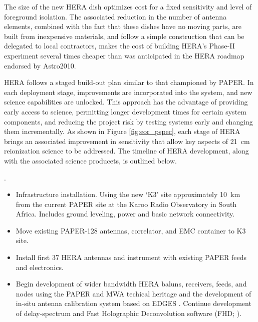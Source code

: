 \documentclass[preprint]{aastex}
\begin{document}
The size of the new HERA dish optimizes cost for a fixed sensitivity and level
of foreground isolation.  The associated reduction in the number of antenna
elements, combined with the fact that these dishes have no moving parts, are
built from inexpensive materials, and follow a simple construction that can be
delegated to local contractors, makes the cost of building HERA's Phase-II
experiment several times cheaper than was anticipated in the HERA roadmap
endorsed by Astro2010.  

HERA follows a staged build-out plan similar to that championed by PAPER.  In
each deployment stage, improvements are incorporated into the system, and new
science capabilities are unlocked.  This approach has the advantage of
providing early access to science, permitting longer development times for
certain system components, and reducing the project risk by testing systems
early and changing them incrementally.  As shown in Figure \ref{fig:eor_pspec}, each
stage of HERA brings an associated improvement in sensitivity that allow key
aspects of 21~cm reionization science to be addressed.  The timeline of HERA
development, along with the associated science producets, is outlined below. 


.  
\begin{itemize}\setlength{\parskip}{0pt}
\vspace{-7pt}
  \item Infrastructure installation. Using the new `K3' site approximately 10~km from the current PAPER site at the Karoo Radio Observatory in South Africa. Includes ground leveling, power and basic network connectivity.
  \item Move existing PAPER-128 antennas, correlator, and EMC container to K3 site.
  \item Install first 37 HERA antennas and instrument with existing PAPER feeds and electronics. 
  \item Begin development of wider bandwidth HERA baluns, receivers, feeds, and nodes using the PAPER and MWA techical heritage \citep{} and the development of in-situ antenna calibration system based on EDGES \citep{}. Continue development of delay-spectrum \citep{} and Fast Holographic Deconvolution software (FHD; \citealt{}).
\end{itemize}
\end{document}
